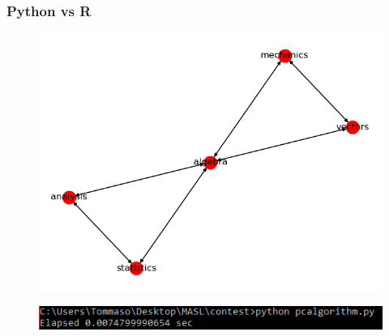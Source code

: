\documentclass[xcolor ={table,usenames,dvipsnames}]{beamer}
\theoremstyle{definition}
\begin{document}
\begin{frame}
\frametitle{Python vs R}
\begin{figure}[h!]
	\centering
	\includegraphics[scale=0.35]{img/pydag}
\end{figure}
\begin{figure}[h!]
	\centering
	\includegraphics[scale=0.5]{img/pytime}
\end{figure}
\end{frame}
\end{document}

